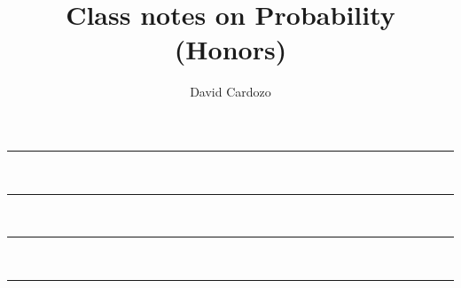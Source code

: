 \documentclass[notitlepage]{article}
\author{David Cardozo}
\title{Class notes on Probability (Honors)}
\begin{document}



\noindent\rule{\textwidth}{1pt}\\[-0.1cm]


\noindent\rule{\textwidth}{1pt}\\[-0.1cm]

	
\noindent\rule{\textwidth}{1pt}\\[-0.1cm] 

%

\noindent\rule{\textwidth}{1pt}\\[-0.1cm] 


	
\end{document}

